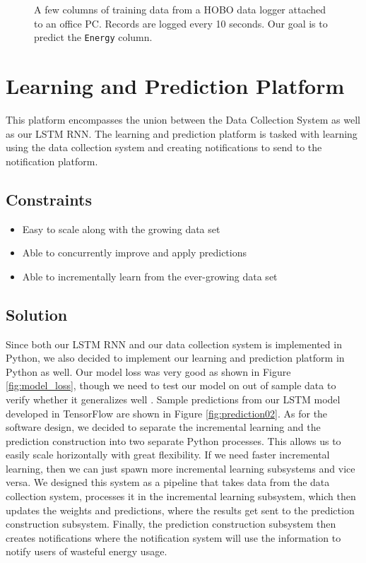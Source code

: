 \documentclass[conference]{IEEEtran}
\begin{document}
\begin{figure}[ht]
	\centering
	\caption{A few columns of training data from a HOBO data logger attached to an office PC. Records are logged every 10 seconds. Our goal is to predict the \texttt{Energy} column.}
	\label{fig:data_hobo}
\end{figure}

\section{Learning and Prediction Platform}
This platform encompasses the union between the Data Collection System as well as our LSTM RNN. The learning and prediction platform is tasked with learning using the data collection system and creating notifications to send to the notification platform.

\subsection{Constraints}
\begin{itemize}
    \item Easy to scale along with the growing data set
    \item Able to concurrently improve and apply predictions
    \item Able to incrementally learn from the ever-growing data set
\end{itemize}

\subsection{Solution}
Since both our LSTM RNN and our data collection system is implemented in Python, we also decided to implement our learning and prediction platform in Python as well. Our model loss was very good as shown in Figure \ref{fig:model_loss}, though we need to test our model on out of sample data to verify whether it generalizes well \cite{b4}. Sample predictions from our LSTM model developed in TensorFlow are shown in Figure \ref{fig:prediction02}. As for the software design, we decided to separate the incremental learning and the prediction construction into two separate Python processes. This allows us to easily scale horizontally with great flexibility. If we need faster incremental learning, then we can just spawn more incremental learning subsystems and vice versa. We designed this system as a pipeline that takes data from the data collection system, processes it in the incremental learning subsystem, which then updates the weights and predictions, where the results get sent to the prediction construction subsystem. Finally, the prediction construction subsystem then creates notifications where the notification system will use the information to notify users of wasteful energy usage.
\end{document}
